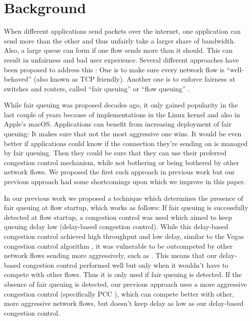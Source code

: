 \documentclass[conference]{IEEEtran}
\begin{document}
\section{Background}

When different applications send packets over the internet, one application can send more than the other and thus unfairly take a larger share of bandwidth. Also, a large queue can form if one flow sends more than it should. 
This can result in unfairness and bad user experience. Several different approaches have been proposed to address this \cite{brown_future_2020,ware_beyond_2019}: One is to make sure every network flow is ``well-behaved'' (also known as TCP friendly). 
Another one is to enforce fairness at switches and routers, called ``fair queuing'' or ``flow queuing'' \cite{nagle_packet_1985}. 

While fair queuing was proposed decades ago, it only gained popularity in the last couple of years because of implementations in the Linux kernel \cite{dumazet_pkt_sched_2013,hoeiland-joergensen_flow_2018} and also in Apple's macOS. 
Applications can benefit from increasing deployment of fair queuing: It makes sure that not the most aggressive one wins. 
It would be even better if applications could know if the connection they're sending on is managed by fair queuing. 
Then they could be sure that they can use their preferred congestion control mechanism, while not bothering or being bothered by other network flows. 
We proposed the first such approach in previous work \cite{bachl_detecting_2021} but our previous approach had some shortcomings upon which we improve in this paper. 

In our previous work we proposed a technique which determines the presence of fair queuing at flow startup, which works as follows: 
If fair queuing is successfully detected at flow startup, a congestion control was used which aimed to keep queuing delay low (delay-based congestion control). 
While this delay-based congestion control achieved high throughput and low delay, similar to the Vegas congestion control algorithm \cite{brakmo_tcp_1995}, 
it was vulnerable to be outcompeted by other network flows sending more aggressively, such as \cite{cardwell_bbr_2016,dong_pcc_2015,ha_cubic_2008}.
This means that our delay-based congestion control performed well but only when it wouldn't have to compete with other flows. Thus it is only used if fair queuing is detected. 
If the absence of fair queuing is detected, our previous approach uses a more aggressive congestion control (specifically PCC \cite{dong_pcc_2015}), which can compete better with other, more aggressive network flows,
but doesn't keep delay as low as our delay-based congestion control. 
\end{document}
